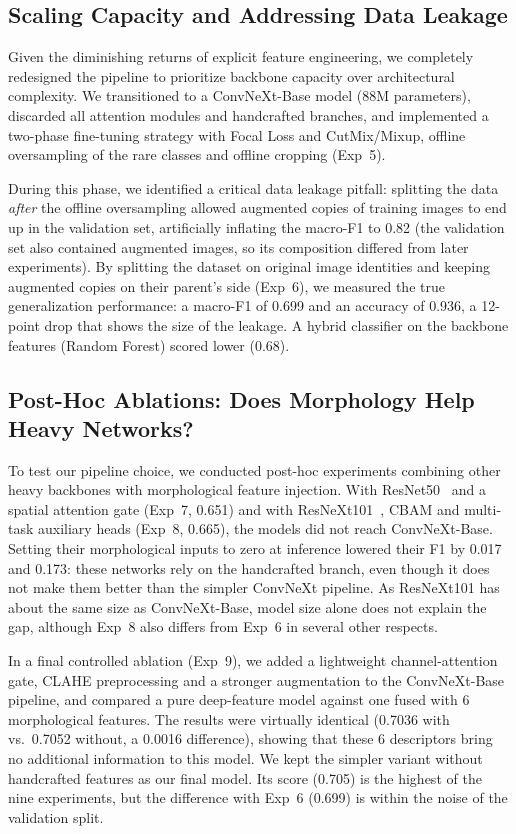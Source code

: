 \documentclass[twocolumn,a4paper]{article}
\begin{document}
\subsection{Scaling Capacity and Addressing Data Leakage}
\label{sec:leakage}

Given the diminishing returns of explicit feature engineering, we completely redesigned the pipeline to prioritize backbone capacity over architectural complexity. We transitioned to a ConvNeXt-Base model (88M parameters), discarded all attention modules and handcrafted branches, and implemented a two-phase fine-tuning strategy with Focal Loss and CutMix/Mixup, offline oversampling of the rare classes and offline cropping (Exp~5).

During this phase, we identified a critical data leakage pitfall: splitting the data \emph{after} the offline oversampling allowed augmented copies of training images to end up in the validation set, artificially inflating the macro-F1 to 0.82 (the validation set also contained augmented images, so its composition differed from later experiments). By splitting the dataset on original image identities and keeping augmented copies on their parent's side (Exp~6), we measured the true generalization performance: a macro-F1 of 0.699 and an accuracy of 0.936, a 12-point drop that shows the size of the leakage. A hybrid classifier on the backbone features (Random Forest) scored lower (0.68).

\subsection{Post-Hoc Ablations: Does Morphology Help Heavy Networks?}
\label{sec:ablations}

To test our pipeline choice, we conducted post-hoc experiments combining other heavy backbones with morphological feature injection. With ResNet50~\cite{he2016deep} and a spatial attention gate (Exp~7, 0.651) and with ResNeXt101~\cite{xie2017aggregated}, CBAM and multi-task auxiliary heads (Exp~8, 0.665), the models did not reach ConvNeXt-Base. Setting their morphological inputs to zero at inference lowered their F1 by 0.017 and 0.173: these networks rely on the handcrafted branch, even though it does not make them better than the simpler ConvNeXt pipeline. As ResNeXt101 has about the same size as ConvNeXt-Base, model size alone does not explain the gap, although Exp~8 also differs from Exp~6 in several other respects.

In a final controlled ablation (Exp~9), we added a lightweight channel-attention gate, CLAHE preprocessing and a stronger augmentation to the ConvNeXt-Base pipeline, and compared a pure deep-feature model against one fused with 6 morphological features. The results were virtually identical (0.7036 with vs.\ 0.7052 without, a 0.0016 difference), showing that these 6 descriptors bring no additional information to this model. We kept the simpler variant without handcrafted features as our final model. Its score (0.705) is the highest of the nine experiments, but the difference with Exp~6 (0.699) is within the noise of the validation split.
\end{document}
